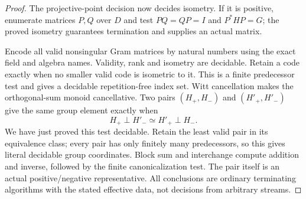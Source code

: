 \begin{proof}
The projective-point decision now decides isometry.
If it is positive, enumerate matrices $P,Q$ over $D$ and
test $PQ=QP=I$ and $P^*HP=G$; the proved isometry guarantees
termination and supplies an actual matrix.

Encode all valid nonsingular Gram matrices by natural numbers
using the exact field and algebra names. Validity, rank and
isometry are decidable. Retain a code exactly when no smaller
valid code is isometric to it. This is a finite predecessor
test and gives a decidable repetition-free index set.
Witt cancellation makes the orthogonal-sum monoid cancellative.
Two pairs $(H_+,H_-)$ and $(H'_+,H'_-)$ give the same group
element exactly when
\[
                  H_+\perp H'_-\simeq H'_+\perp H_- . \tag{C.3.HP8}
\]
We have just proved this test decidable. Retain the least
valid pair in its equivalence class; every pair has only
finitely many predecessors, so this gives literal decidable
group coordinates. Block sum and interchange compute addition
and inverse, followed by the finite canonicalization test.
The pair itself is an actual positive/negative representative.
All conclusions are ordinary terminating algorithms with the
stated effective data, not decisions from arbitrary streams.
\end{proof}
